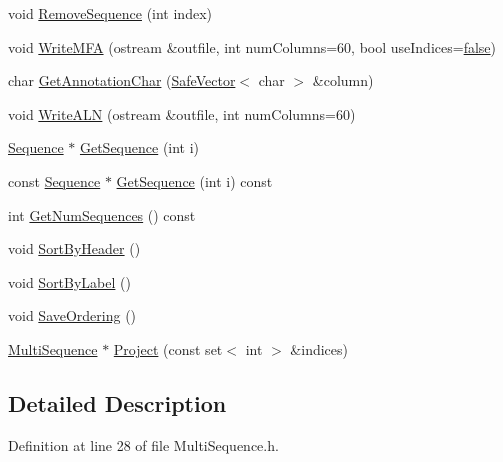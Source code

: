 \begin{DoxyCompactItemize}
\item 
void \hyperlink{class_p_r_o_b_c_o_n_s_1_1_multi_sequence_a544a359ed76ce9b68e9d0e0ea575119c}{Remove\+Sequence} (int index)
\item 
void \hyperlink{class_p_r_o_b_c_o_n_s_1_1_multi_sequence_aec1123b3ca086c39514a8b58948a4628}{Write\+M\+F\+A} (ostream \&outfile, int num\+Columns=60, bool use\+Indices=\hyperlink{naview_8c_a65e9886d74aaee76545e83dd09011727}{false})
\item 
char \hyperlink{class_p_r_o_b_c_o_n_s_1_1_multi_sequence_aa39e095e71feef8649a8cc9c29ddc3ae}{Get\+Annotation\+Char} (\hyperlink{class_p_r_o_b_c_o_n_s_1_1_safe_vector}{Safe\+Vector}$<$ char $>$ \&column)
\item 
void \hyperlink{class_p_r_o_b_c_o_n_s_1_1_multi_sequence_a1b48c7ac2f959bcf478868bfe7772b7d}{Write\+A\+L\+N} (ostream \&outfile, int num\+Columns=60)
\item 
\hyperlink{class_p_r_o_b_c_o_n_s_1_1_sequence}{Sequence} $\ast$ \hyperlink{class_p_r_o_b_c_o_n_s_1_1_multi_sequence_a1ec546f0396cf54133920716ca27cd63}{Get\+Sequence} (int i)
\item 
const \hyperlink{class_p_r_o_b_c_o_n_s_1_1_sequence}{Sequence} $\ast$ \hyperlink{class_p_r_o_b_c_o_n_s_1_1_multi_sequence_add6302060d0dabe5c3ed52b13d13037f}{Get\+Sequence} (int i) const 
\item 
int \hyperlink{class_p_r_o_b_c_o_n_s_1_1_multi_sequence_a08c1adcbbd476649046724bf644c3286}{Get\+Num\+Sequences} () const 
\item 
void \hyperlink{class_p_r_o_b_c_o_n_s_1_1_multi_sequence_a37a441969876f74058c8ee7bc218141b}{Sort\+By\+Header} ()
\item 
void \hyperlink{class_p_r_o_b_c_o_n_s_1_1_multi_sequence_a65c41317536f201c1d0df9d03e9be5e3}{Sort\+By\+Label} ()
\item 
void \hyperlink{class_p_r_o_b_c_o_n_s_1_1_multi_sequence_ab0f074425a9fe4c5c81913d862276343}{Save\+Ordering} ()
\item 
\hyperlink{class_p_r_o_b_c_o_n_s_1_1_multi_sequence}{Multi\+Sequence} $\ast$ \hyperlink{class_p_r_o_b_c_o_n_s_1_1_multi_sequence_a67e3a9501aee86f5e17dd24133c0679e}{Project} (const set$<$ int $>$ \&indices)
\end{DoxyCompactItemize}


\subsection{Detailed Description}


Definition at line 28 of file Multi\+Sequence.\+h.



